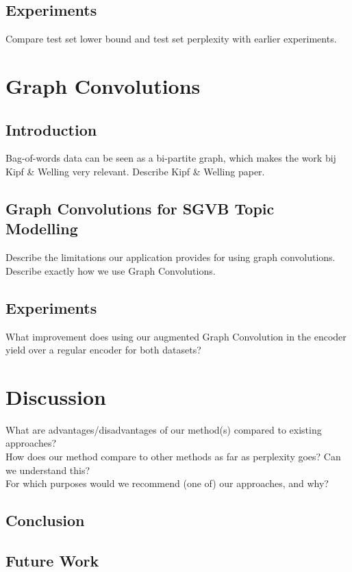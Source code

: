 \documentclass{report}
\begin{document}
\section{Experiments}
Compare test set lower bound and test set perplexity with earlier experiments.
\chapter{Graph Convolutions}
\section{Introduction}
Bag-of-words data can be seen as a bi-partite graph, which makes the work bij Kipf \& Welling very relevant. Describe Kipf \& Welling paper.
\section{Graph Convolutions for SGVB Topic Modelling}
Describe the limitations our application provides for using graph convolutions.\\
Describe exactly how we use Graph Convolutions.
\section{Experiments}
What improvement does using our augmented Graph Convolution in the encoder yield over a regular encoder for both datasets?
\chapter{Discussion}
What are advantages/disadvantages of our method(s) compared to existing approaches?\\
How does our method compare to other methods as far as perplexity goes? Can we understand this?\\
For which purposes would we recommend (one of) our approaches, and why? \\
\section{Conclusion}
\section{Future Work}

\end{document}
